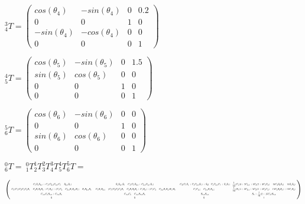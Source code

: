 \documentclass[8pt]{article}
\begin{document}
\begin{list}{()~}{}
$^3_4T = \left( \begin{array}{cccc}
cos(\theta_4) & -sin(\theta_4) & 0 & 0.2 \\
0 & 0 & 1 & 0 \\
-sin(\theta_4) & -cos(\theta_4) & 0 & 0 \\
0 & 0 & 0 & 1
\end{array} \right) $

$^4_5T = \left( \begin{array}{cccc}
cos(\theta_5) & -sin(\theta_5) & 0 & 1.5 \\
sin(\theta_5) & cos(\theta_5) & 0 & 0 \\
0 & 0 & 1 & 0 \\
0 & 0 & 0 & 1
\end{array} \right) $

$^5_6T = \left( \begin{array}{cccc}
cos(\theta_6) & -sin(\theta_6) & 0 & 0 \\
0 & 0 & 1 & 0 \\
sin(\theta_6) & cos(\theta_6) & 0 & 0 \\
0 & 0 & 0 & 1
\end{array} \right) $

$^0_6T = \ ^0_1T ^1_2T ^2_3T ^3_4T ^4_5T ^5_6T =$

\newcommand\scalemath[2]{\scalebox{#1}{\mbox{\ensuremath{\displaystyle #2}}}}

$ \left( 
\scalemath{0.38}{
\begin{array}{cccc}
- C_6 S_1 S_{4,5} + C_1 (C_{2,3} C_{4,5} C_6 - S_{2,3} S_6) & S_1 S_{4,5} S_6 - 
 C_1 (C_6 S_{2,3} + C_{2,3} C_{4,5} S_6) & -C_4 (C_5 S_1 + C_1 C_{2,3} S_5) + 
 S_4 (-C_1 C_{2,3} C_5 + S_1 S_5) & \dfrac{1}{10} (C_1 (3 + 2 C_{2,3} + 5 C_2 (2 + 3 C_3 C_4) - 
      15 C_4 S_2 S_3) - 15 S_1 S_4) \\
C_6 (C_5 (C_2 C_3 C_4 S_1 - 
       C_4 S_1 S_2 S_3 + 
       C_1 S_4) + (C_1 C_4 - 
       C_{2,3} S_1 S_4) S_5) - 
 S_1 S_{2,3} S_6 & -C_6 S_1 S_{2,3} - (C_5 (C_2 C_3 C_4 S_1 - 
       C_4 S_1 S_2 S_3 + 
       C_1 S_4) + (C_1 C_4 - 
       C_{2,3} S_1 S_4) S_5) S_6 & C_1 C_{4,5} - C_{2,3} S_1 S_{4,5} & \dfrac{1}{10} (S_1 (3 + 2 C_{2,3} + 5 C_2 (2 + 3 C_3 C_4) - 
      15 C_4 S_2 S_3) + 15 C_1 S_4) \\
 C_{4,5} C_{6} S_{2,3} + C_{2,3} S_6 & C_{2,3} C_6 - C_{4,5} S_{2,3} S_6 & -S_{2,3} S_{4,5} & S_2 + \dfrac{1}{10} (2 + 15 C_4) S_{2,3} \\
 0 & 0 & 0 & 1
\end{array}
}
 \right) $


\end{list}
\end{document}
